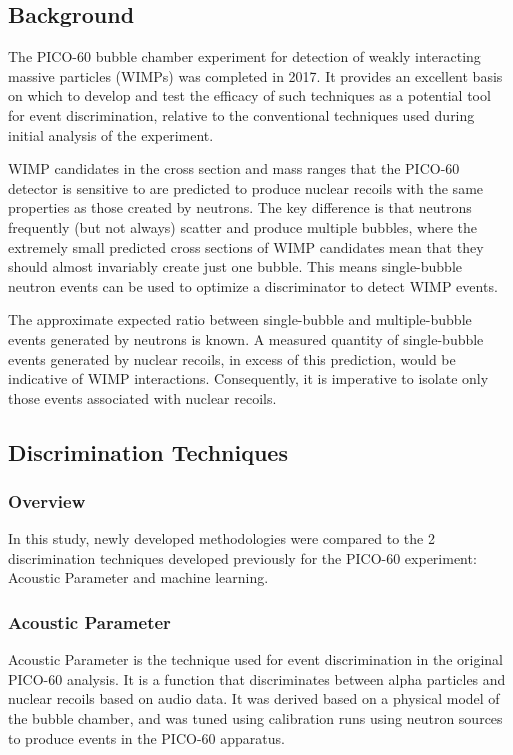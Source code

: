 \documentclass[10pt]{article}
\begin{document}
\subsection{Background}

The PICO-60 bubble chamber experiment for detection of weakly interacting massive particles (WIMPs) \cite{pico} was completed in 2017. It provides an excellent basis on which to develop and test the efficacy of such techniques as a potential tool for event discrimination, relative to the conventional techniques used during initial analysis of the experiment.

WIMP candidates in the cross section and mass ranges that the PICO-60 detector is sensitive to are predicted to produce nuclear recoils with the same properties as those created by neutrons. The key difference is that neutrons frequently (but not always) scatter and produce multiple bubbles, where the extremely small predicted cross sections of WIMP candidates mean that they should almost invariably create just one bubble. This means single-bubble neutron events can be used to optimize a discriminator to detect WIMP events.

The approximate expected ratio between single-bubble and multiple-bubble events generated by neutrons is known. A measured quantity of single-bubble events generated by nuclear recoils, in excess of this prediction, would be indicative of WIMP interactions. Consequently, it is imperative to isolate only those events associated with nuclear recoils.

\subsection{Discrimination Techniques}

\subsubsection{Overview}

In this study, newly developed methodologies were compared to the 2 discrimination techniques developed previously for the PICO-60 experiment: Acoustic Parameter and machine learning.

\subsubsection{Acoustic Parameter}

Acoustic Parameter is the technique used for event discrimination in the original PICO-60 analysis. It is a function that discriminates between alpha particles and nuclear recoils based on audio data. It was derived based on a physical model of the bubble chamber, and was tuned using calibration runs using neutron sources to produce events in the PICO-60 apparatus.
\end{document}
